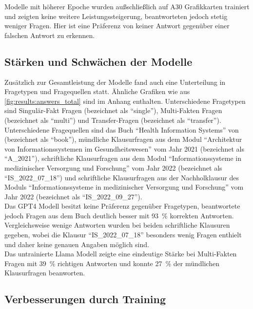 Modelle mit höherer Epoche wurden außschließlich auf A30 Grafikkarten trainiert und zeigten keine weitere Leistungssteigerung, beantworteten jedoch stetig weniger Fragen.
Hier ist eine Präferenz von keiner Antwort gegenüber einer falschen Antwort zu erkennen.\\

\subsection{Stärken und Schwächen der Modelle}
Zusätzlich zur Gesamtleistung der Modelle fand auch eine Unterteilung in Fragetypen und Fragequellen statt.
Ähnliche Grafiken wie aus \cref{fig:results:answers_total} sind im Anhang enthalten.
Unterschiedene Fragetypen sind Singulär-Fakt Fragen (bezeichnet als \enquote{single}), Multi-Fakten Fragen (bezeichnet als \enquote{multi}) und Transfer-Fragen (bezeichnet als \enquote{transfer}). Unterschiedene Fragequellen sind das Buch \enquote{Health Information Systems} von \citet{bb} (bezeichnet als \enquote{book}), mündliche Klausurfragen aus dem Modul \enquote{Architektur von Informationssystemen im Gesundheitswesen} vom Jahr 2021 (bezeichnet als \enquote{A\_2021}), schriftliche Klausurfragen aus dem Modul \enquote{Informationssysteme in medizinischer Versorgung und Forschung} vom Jahr 2022 (bezeichnet als \enquote{IS\_2022\_07\_18}) und schriftliche Klausurfragen aus der Nachholklausur des Moduls \enquote{Informationssysteme in medizinischer Versorgung und Forschung} vom Jahr 2022 (bezeichnet als \enquote{IS\_2022\_09\_27}).\\

Das GPT4 Modell besitzt keine Präferenz gegenüber Fragetypen, beantwortete jedoch Fragen aus dem Buch deutlich besser mit \SI{93}{\percent} korrekten Antworten.
Vergleichsweise wenige Antworten wurden bei beiden schriftliche Klausuren gegeben, wobei die Klausur \enquote{IS\_2022\_07\_18} besonders wenig Fragen enthielt und daher keine genauen Angaben möglich sind.\\

Das untrainierte Llama Modell zeigte eine eindeutige Stärke bei Multi-Fakten Fragen mit \SI{39}{\percent} richtigen Antworten und konnte \SI{27}{\percent} der mündlichen Klausurfragen beanworten. 
\subsection{Verbesserungen durch Training}
